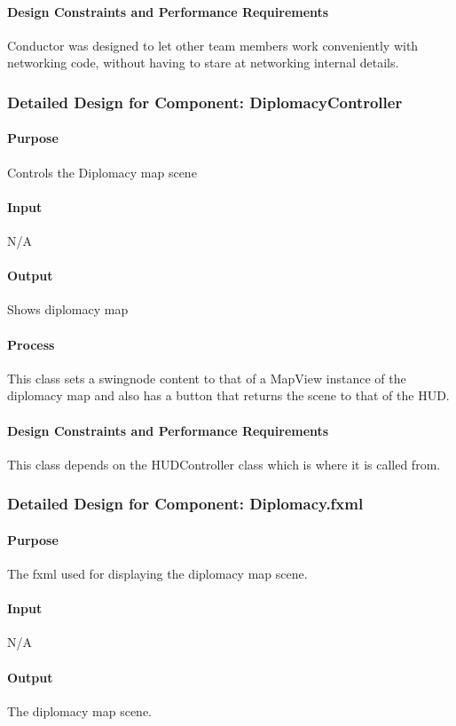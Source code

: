 \documentclass[12pt,a4paper,titlepage]{article}
\begin{document}
\paragraph{Design Constraints and Performance Requirements} Conductor was designed to let other team members work conveniently with networking code, without having to stare at networking internal details.

\subsubsection{Detailed Design for Component: DiplomacyController }
\paragraph{Purpose} Controls the Diplomacy map scene
\paragraph{Input} N/A
\paragraph{Output} Shows diplomacy map
\paragraph{Process} This class sets a swingnode content to that of a MapView instance of the 
		diplomacy map and also has a button that returns the scene to that of the HUD.
\paragraph{Design Constraints and Performance Requirements} This class depends on the 
		HUDController class which is where it is called from. 

\subsubsection{Detailed Design for Component: Diplomacy.fxml }
\paragraph{Purpose} The fxml used for displaying the diplomacy map scene.
\paragraph{Input} N/A
\paragraph{Output} The diplomacy map scene.
\end{document}

